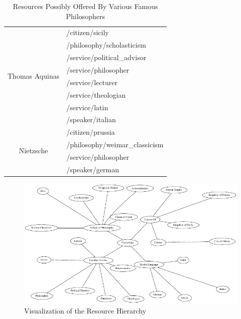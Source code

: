 \begin{table}
\begin{center}
\begin{tabular}{| c | l |}
			\hline
			  \multirow{8}{*}{Thomas Aquinas}        & /citizen/sicily \\
			                                         & /philosophy/scholasticism \\
			                                         & /service/political\_advisor \\
			                                         & /service/philosopher \\
			                                         & /service/lecturer \\
			                                         & /service/theologian \\
			                                         & /service/latin \\
			                                         & /speaker/italian \\
			\hline
			  \multirow{4}{*}{Nietzsche}             & /citizen/prussia \\
			                                         & /philosophy/weimar\_classicism \\
			                                         & /service/philosopher \\
			                                         & /speaker/german \\
			\hline
		\end{tabular}
	\end{center}
	\caption{Resources Possibly Offered By Various Famous Philosophers}
	\label{tbl:res-philosopher}
\end{table}

\begin{figure}
	\begin{center}\includegraphics[width=\myfigwidth,height=\myfigheight,keepaspectratio]{figs/dot/res_example2}\end{center}
	\caption{Visualization of the Resource Hierarchy}\label{fig:res-example2}
\end{figure}

